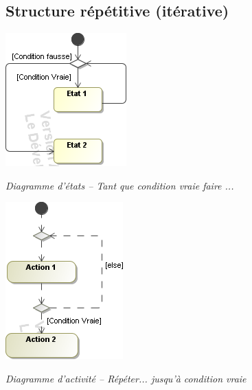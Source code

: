 \documentclass[10pt]{article}
\begin{document}
\subsection{Structure répétitive (itérative)}
\begin{minipage}[c]{.48\linewidth}
\begin{center}
\includegraphics[width=.8\textwidth]{images/Iteratif_stm}

\textit{Diagramme d'états -- Tant que condition vraie faire ...}
\end{center}
\end{minipage} \hfill
\begin{minipage}[c]{.48\linewidth}
\begin{center}
\includegraphics[width=.6\textwidth]{images/Iteratif_act}

\textit{Diagramme d'activité -- Répéter... jusqu'à condition vraie}
\end{center}
\end{minipage}
\end{document}
